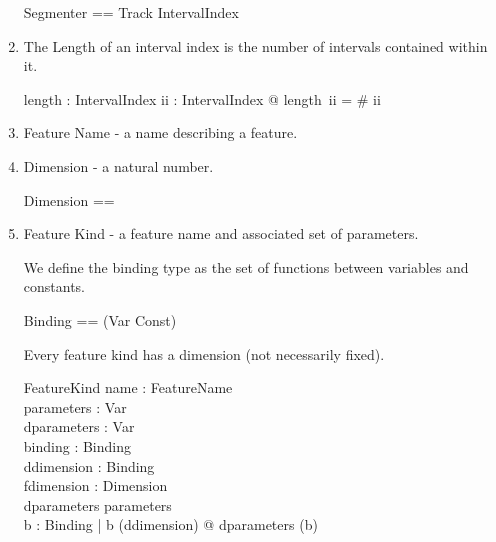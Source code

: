 \documentclass[11pt]{article}
\begin{document}
\begin{enumerate}
\begin{flushright}
  \begin{tikzpicture}
    
    
  \end{tikzpicture}
\end{flushright}

\begin{zed}
	Segmenter == Track \fun IntervalIndex  \\
\end{zed}

\item The \textsf{Length} of an interval index is the number of intervals contained within it. 

\begin{axdef}
	length : IntervalIndex \fun \nat 
\where
	\forall ii : IntervalIndex @ length~ii = \# ii
\end{axdef}


\item \textsf{Feature Name} - a name describing a feature.

\begin{zed}
	[FeatureName]
\end{zed}

\item \textsf{Dimension} - a natural number.

\begin{zed}
	Dimension ==	 \nat
\end{zed}

\item \textsf{Feature Kind} - a feature name and associated set of parameters. 

\begin{zed}
\end{zed}

We define the binding type as the set of functions between variables and constants. 

\begin{zed}
	Binding == \power (Var \cross Const) 
\end{zed}

Every feature kind has a dimension (not necessarily fixed). 

\begin{schema}{FeatureKind}
	name :  FeatureName \\
	parameters : \power Var \\
	dparameters : \power Var \\
	binding : Binding \\
	ddimension : Binding \pfun \nat  \\ 
	fdimension : Dimension  \\
\where
	dparameters  \subseteq parameters  \\
	\forall b : Binding |  b \in (\dom ddimension) @ dparameters \subseteq  (\dom b) 
\end{schema}


\end{enumerate}
\end{document}
